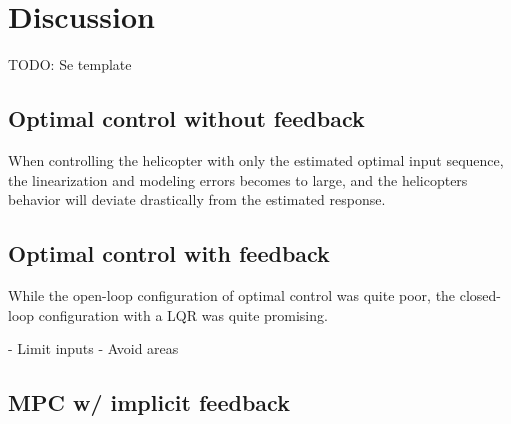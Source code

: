 \section{Discussion}\label{sec:discussion}
TODO: Se template
\subsection{Optimal control without feedback}
When controlling the helicopter with only the estimated optimal input sequence, the linearization and modeling errors becomes to large, and the helicopters behavior will deviate drastically from the estimated response.

\subsection{Optimal control with feedback}
While the open-loop configuration of optimal control was quite poor, the closed-loop configuration with a LQR was quite promising.

- Limit inputs
- Avoid areas

\subsection{MPC w/ implicit feedback}


